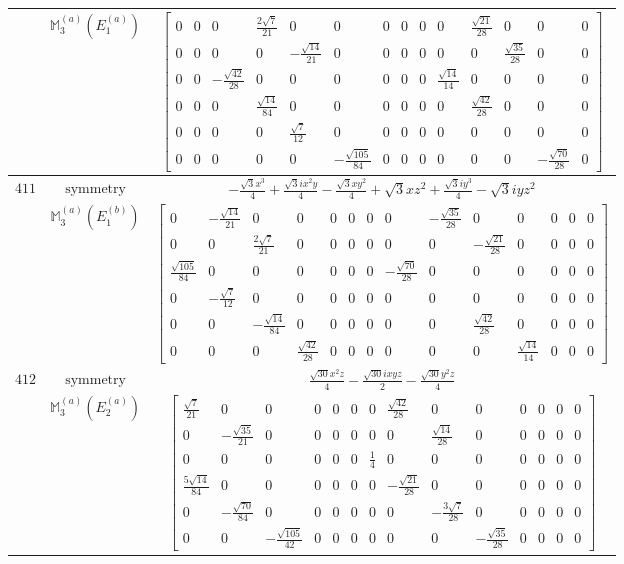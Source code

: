 \documentclass[fleqn,8pt,landscape]{jsarticle}
\begin{document}
\begin{longtable}{ccc}
$  $ & $ \mathbb{M}_{3}^{(a)}(E_{1}^{(a)}) $ & $ \begin{bmatrix} 0 & 0 & 0 & \frac{2 \sqrt{7}}{21} & 0 & 0 & 0 & 0 & 0 & 0 & \frac{\sqrt{21}}{28} & 0 & 0 & 0 \\ 0 & 0 & 0 & 0 & - \frac{\sqrt{14}}{21} & 0 & 0 & 0 & 0 & 0 & 0 & \frac{\sqrt{35}}{28} & 0 & 0 \\ 0 & 0 & - \frac{\sqrt{42}}{28} & 0 & 0 & 0 & 0 & 0 & 0 & \frac{\sqrt{14}}{14} & 0 & 0 & 0 & 0 \\ 0 & 0 & 0 & \frac{\sqrt{14}}{84} & 0 & 0 & 0 & 0 & 0 & 0 & \frac{\sqrt{42}}{28} & 0 & 0 & 0 \\ 0 & 0 & 0 & 0 & \frac{\sqrt{7}}{12} & 0 & 0 & 0 & 0 & 0 & 0 & 0 & 0 & 0 \\ 0 & 0 & 0 & 0 & 0 & - \frac{\sqrt{105}}{84} & 0 & 0 & 0 & 0 & 0 & 0 & - \frac{\sqrt{70}}{28} & 0 \end{bmatrix} $ \\ \hline
$ 411 $ & $ \text{symmetry} $ & $ - \frac{\sqrt{3} x^{3}}{4} + \frac{\sqrt{3} i x^{2} y}{4} - \frac{\sqrt{3} x y^{2}}{4} + \sqrt{3} x z^{2} + \frac{\sqrt{3} i y^{3}}{4} - \sqrt{3} i y z^{2} $ \\
$  $ & $ \mathbb{M}_{3}^{(a)}(E_{1}^{(b)}) $ & $ \begin{bmatrix} 0 & - \frac{\sqrt{14}}{21} & 0 & 0 & 0 & 0 & 0 & 0 & - \frac{\sqrt{35}}{28} & 0 & 0 & 0 & 0 & 0 \\ 0 & 0 & \frac{2 \sqrt{7}}{21} & 0 & 0 & 0 & 0 & 0 & 0 & - \frac{\sqrt{21}}{28} & 0 & 0 & 0 & 0 \\ \frac{\sqrt{105}}{84} & 0 & 0 & 0 & 0 & 0 & 0 & - \frac{\sqrt{70}}{28} & 0 & 0 & 0 & 0 & 0 & 0 \\ 0 & - \frac{\sqrt{7}}{12} & 0 & 0 & 0 & 0 & 0 & 0 & 0 & 0 & 0 & 0 & 0 & 0 \\ 0 & 0 & - \frac{\sqrt{14}}{84} & 0 & 0 & 0 & 0 & 0 & 0 & \frac{\sqrt{42}}{28} & 0 & 0 & 0 & 0 \\ 0 & 0 & 0 & \frac{\sqrt{42}}{28} & 0 & 0 & 0 & 0 & 0 & 0 & \frac{\sqrt{14}}{14} & 0 & 0 & 0 \end{bmatrix} $ \\ \hline
$ 412 $ & $ \text{symmetry} $ & $ \frac{\sqrt{30} x^{2} z}{4} - \frac{\sqrt{30} i x y z}{2} - \frac{\sqrt{30} y^{2} z}{4} $ \\
$  $ & $ \mathbb{M}_{3}^{(a)}(E_{2}^{(a)}) $ & $ \begin{bmatrix} \frac{\sqrt{7}}{21} & 0 & 0 & 0 & 0 & 0 & 0 & \frac{\sqrt{42}}{28} & 0 & 0 & 0 & 0 & 0 & 0 \\ 0 & - \frac{\sqrt{35}}{21} & 0 & 0 & 0 & 0 & 0 & 0 & \frac{\sqrt{14}}{28} & 0 & 0 & 0 & 0 & 0 \\ 0 & 0 & 0 & 0 & 0 & 0 & \frac{1}{4} & 0 & 0 & 0 & 0 & 0 & 0 & 0 \\ \frac{5 \sqrt{14}}{84} & 0 & 0 & 0 & 0 & 0 & 0 & - \frac{\sqrt{21}}{28} & 0 & 0 & 0 & 0 & 0 & 0 \\ 0 & - \frac{\sqrt{70}}{84} & 0 & 0 & 0 & 0 & 0 & 0 & - \frac{3 \sqrt{7}}{28} & 0 & 0 & 0 & 0 & 0 \\ 0 & 0 & - \frac{\sqrt{105}}{42} & 0 & 0 & 0 & 0 & 0 & 0 & - \frac{\sqrt{35}}{28} & 0 & 0 & 0 & 0 \end{bmatrix} $ \\ \hline

\end{longtable}
\end{document}
